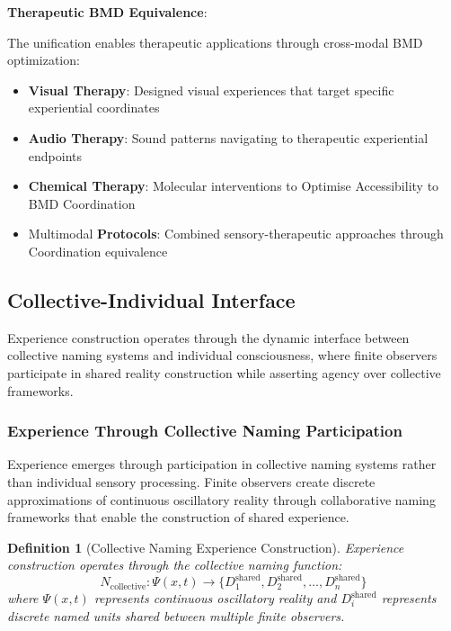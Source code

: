 \documentclass{article}
\newtheorem{definition}[theorem]{Definition}
\begin{document}
\textbf{Therapeutic BMD Equivalence}:

The unification enables therapeutic applications through cross-modal BMD optimization:
\begin{itemize}
\item \textbf{Visual Therapy}: Designed visual experiences that target specific experiential coordinates
\item \textbf{Audio Therapy}: Sound patterns navigating to therapeutic experiential endpoints
\item \textbf{Chemical Therapy}: Molecular interventions to Optimise Accessibility to BMD Coordination
\item Multimodal \textbf{ Protocols}: Combined sensory-therapeutic approaches through Coordination equivalence
\end{itemize}

\subsection{Collective-Individual Interface}

Experience construction operates through the dynamic interface between collective naming systems and individual consciousness, where finite observers participate in shared reality construction while asserting agency over collective frameworks.

\subsubsection{Experience Through Collective Naming Participation}

Experience emerges through participation in collective naming systems rather than individual sensory processing. Finite observers create discrete approximations of continuous oscillatory reality through collaborative naming frameworks that enable the construction of shared experience.

\begin{definition}[Collective Naming Experience Construction]
Experience construction operates through the collective naming function:
\begin{equation}
N_{\text{collective}}: \Psi(x,t) \rightarrow \{D_1^{\text{shared}}, D_2^{\text{shared}}, \ldots, D_n^{\text{shared}}\}
\end{equation}
where $\Psi(x,t)$ represents continuous oscillatory reality and $D_i^{\text{shared}}$ represents discrete named units shared between multiple finite observers.
\end{definition}
\end{document}
